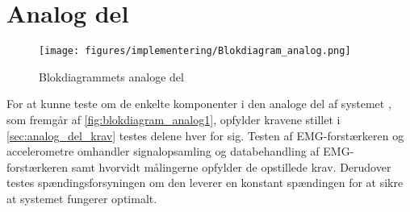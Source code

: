 \section{Analog del}
\begin{figure}[H]
\centering
\texttt{[image: figures/implementering/Blokdiagram\_analog.png]}
\caption{Blokdiagrammets analoge del}
\label{fig:blokdiagram_analog1}
\end{figure}


For at kunne teste om de enkelte komponenter i den analoge del af systemet  , som fremgår af \autoref{fig:blokdiagram_analog1}, opfylder kravene stillet i \autoref{sec:analog_del_krav} testes delene hver for sig. Testen af EMG-forstærkeren og accelerometre omhandler signalopsamling og databehandling af EMG-forstærkeren samt hvorvidt målingerne opfylder de opstillede krav. Derudover testes spændingsforsyningen om den leverer en konstant spændingen for at sikre at systemet fungerer optimalt. 